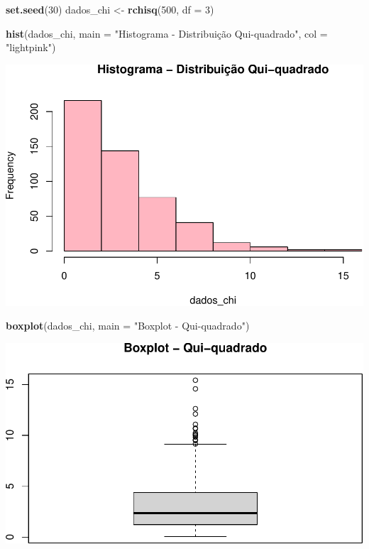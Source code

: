 \documentclass[
]{book}
\newenvironment{Shaded}{\begin{snugshade}}{\end{snugshade}}
\newcommand{\AttributeTok}[1]{\textcolor[rgb]{0.13,0.29,0.53}{#1}}
\newcommand{\DecValTok}[1]{\textcolor[rgb]{0.00,0.00,0.81}{#1}}
\newcommand{\FunctionTok}[1]{\textcolor[rgb]{0.13,0.29,0.53}{\textbf{#1}}}
\newcommand{\NormalTok}[1]{#1}
\newcommand{\OtherTok}[1]{\textcolor[rgb]{0.56,0.35,0.01}{#1}}
\newcommand{\StringTok}[1]{\textcolor[rgb]{0.31,0.60,0.02}{#1}}
\begin{document}
\begin{Shaded}
\begin{Highlighting}[]
\FunctionTok{set.seed}\NormalTok{(}\DecValTok{30}\NormalTok{)}
\NormalTok{dados\_chi }\OtherTok{\textless{}{-}} \FunctionTok{rchisq}\NormalTok{(}\DecValTok{500}\NormalTok{, }\AttributeTok{df =} \DecValTok{3}\NormalTok{)}

\FunctionTok{hist}\NormalTok{(dados\_chi, }\AttributeTok{main =} \StringTok{"Histograma {-} Distribuição Qui{-}quadrado"}\NormalTok{, }\AttributeTok{col =} \StringTok{"lightpink"}\NormalTok{)}
\end{Highlighting}
\end{Shaded}

\includegraphics{LivroEstatisticaR_files/figure-latex/nnormalDist-1.pdf}

\begin{Shaded}
\begin{Highlighting}[]
\FunctionTok{boxplot}\NormalTok{(dados\_chi, }\AttributeTok{main =} \StringTok{"Boxplot {-} Qui{-}quadrado"}\NormalTok{)}
\end{Highlighting}
\end{Shaded}

\includegraphics{LivroEstatisticaR_files/figure-latex/nnormalDist-2.pdf}
\end{document}
